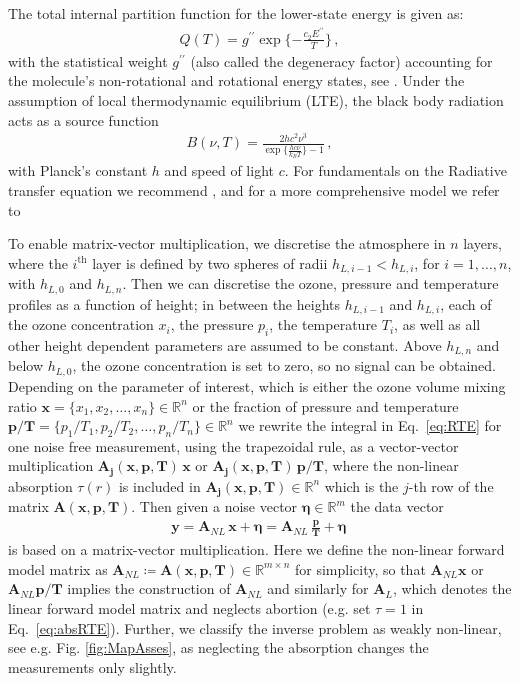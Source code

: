 The total internal partition function for the lower-state energy is given as:
\begin{align}
	Q(T )= g^{\prime \prime} \exp{\{ - \frac{ c_2 E^{\prime \prime} }{T}\}} \, ,
\end{align}
with the statistical weight $ g^{\prime \prime}$ (also called the degeneracy factor) accounting for the molecule's non-rotational and rotational energy states, see \cite{vsimevckova2006einstein}.
Under the assumption of local thermodynamic equilibrium (LTE), the black body radiation acts as a source function
\begin{align}
	B(\nu,T)   = \frac{2 h c^2 \nu^3}{\exp{\{\frac{hc\nu}{k_B T}\}}-1}\, ,
\end{align}
with Planck's constant $h$ and speed of light $c$.
For fundamentals on the Radiative transfer equation we recommend \cite[Chapter 1]{rybicki2000rte}, and for a more comprehensive model we refer to \cite{read2006forwardModel}

To enable matrix-vector multiplication, we discretise the atmosphere in $n$ layers, where the $i^\text{th}$ layer is defined by two spheres of radii $h_{L,i-1} < h_{L,i}$, for $i = 1, \dots, n$, with $h_{L,0}$ and $h_{L,n} $.
Then we can discretise the ozone, pressure and temperature profiles as a function of height; in between the heights $h_{L,i-1}$ and $h_{L,i}$, each of the ozone concentration $x_{i}$, the pressure $p_{i}$, the temperature $T_{i}$, as well as all other height dependent parameters are assumed to be constant.
Above $h_{L, n}$ and below $h_{L,0} $, the ozone concentration is set to zero, so no signal can be obtained.
Depending on the parameter of interest, which is either the ozone volume mixing ratio $\bm{x} =\{x_1,x_2,\ldots,x_n\} \in \mathbb{R}^{n}$ or the fraction of pressure and temperature $\bm{p/T}= \{p_1/T_1,p_2/T_2,\ldots,p_n/T_n\} \in \mathbb{R}^{n} $
we rewrite the integral in Eq.~\eqref{eq:RTE} for one noise free measurement, using the trapezoidal rule, as a vector-vector multiplication $\bm{A_{j}}(\bm{x},  \bm{p},\bm{T}) \, \bm{x} $ or $\bm{A_{j}}(\bm{x},  \bm{p},\bm{T}) \, \bm{p}/ \bm{T} $, where the non-linear absorption $\tau(r)$ is included in $\bm{A_{j}}(\bm{x},  \bm{p},\bm{T}) \in \mathbb{R}^{n}$ which is the $j$-th row of the matrix $\bm{A}(\bm{x},  \bm{p},\bm{T})$.
Then given a noise vector $\bm{\eta} \in \mathbb{R}^{m}$ the data vector
\begin{align}
	\bm{y} = \bm{A}_{NL} \, \bm{x} + \bm{\eta}= \bm{A}_{NL} \,
	\frac{ \bm{p}}{\bm{T}} + \bm{\eta} \, 
\end{align}
is based on a matrix-vector multiplication.
Here we define the non-linear forward model matrix as $\bm{A}_{NL} \coloneqq \bm{A}(\bm{x},  \bm{p},\bm{T})   \in \mathbb{R}^{m \times n}$ for simplicity, so that $\bm{A}_{NL}\bm{x}$ or $\bm{A}_{NL}\bm{p}/\bm{T}$ implies the construction of $\bm{A}_{NL}$ and similarly for $\bm{A}_L$, which denotes the linear forward model matrix and neglects abortion (e.g. set $\tau = 1$ in Eq.~\eqref{eq:absRTE}).
Further, we classify the inverse problem as weakly non-linear, see e.g. Fig. \ref{fig:MapAsses}, as neglecting the absorption changes the measurements only slightly.



